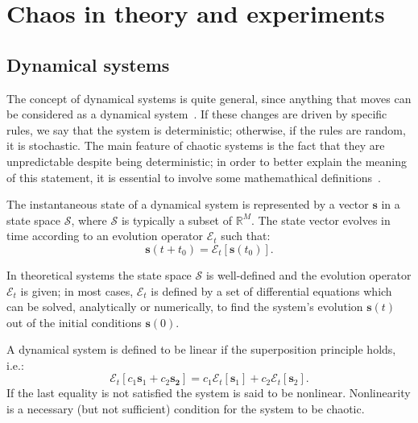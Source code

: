 \chapter{Chaos in theory and experiments}\label{chap: chaos}

\section{Dynamical systems}\label{sec: dynamical systems}

The concept of dynamical systems is quite general, since anything that moves can be considered as a
dynamical system~\cite{ref:fractal_dim}. If these changes are driven
by specific rules, we say that the system is deterministic; otherwise, if the rules
are random, it is stochastic. The main feature of chaotic systems is the fact that they are unpredictable
despite being deterministic; in order to better explain the meaning of this statement, it is essential
to involve some mathemathical definitions~\cite{perinelli2020new}.

The instantaneous state of a dynamical system is represented by a vector $\mathbf{s}$ in a state space $\mathcal{S}$, where $\mathcal{S}$ is typically a subset of $\mathbb{R}^M$.
The state vector evolves in time according to an evolution operator $\mathcal{E}_t$ such that:
\begin{equation}
\label{eq: state space evolution}
    \mathbf{s}(t+t_0)=\mathcal{E}_t[\mathbf{s}(t_0)].
\end{equation}

In theoretical systems the state space $\mathcal{S}$ is well-defined and the evolution operator
$\mathcal{E}_t$ is given; in most cases, $\mathcal{E}_t$ is defined by a set of differential equations
which can be solved, analytically or numerically, to find the system's evolution $\mathbf{s}(t)$
out of the initial conditions $\mathbf{s}(0)$.

A dynamical system is defined to be linear if the superposition principle holds, i.e.:
\begin{equation}
\label{eq: linear systems}
    \mathcal{E}_t[c_1\mathbf{s}_1+c_2\mathbf{s_2}]=c_1\mathcal{E}_t[\mathbf{s}_1]+
    c_2\mathcal{E}_t[\mathbf{s}_2].
\end{equation}
If the last equality is not satisfied the system is said to be nonlinear.
Nonlinearity is a necessary (but not sufficient) condition for the system to be chaotic.

